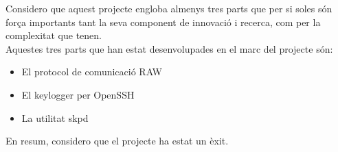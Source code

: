 Considero que aquest projecte engloba almenys tres parts que per si soles són força importants
tant la seva component de innovació i recerca, com per la complexitat que
tenen. \\
Aquestes tres parts que han estat desenvolupades en el marc del projecte són:
\begin{itemize}
	\item El protocol de comunicació RAW
	\item El keylogger per OpenSSH
	\item La utilitat skpd 
\end{itemize}

En resum, considero que el projecte ha estat un èxit.

